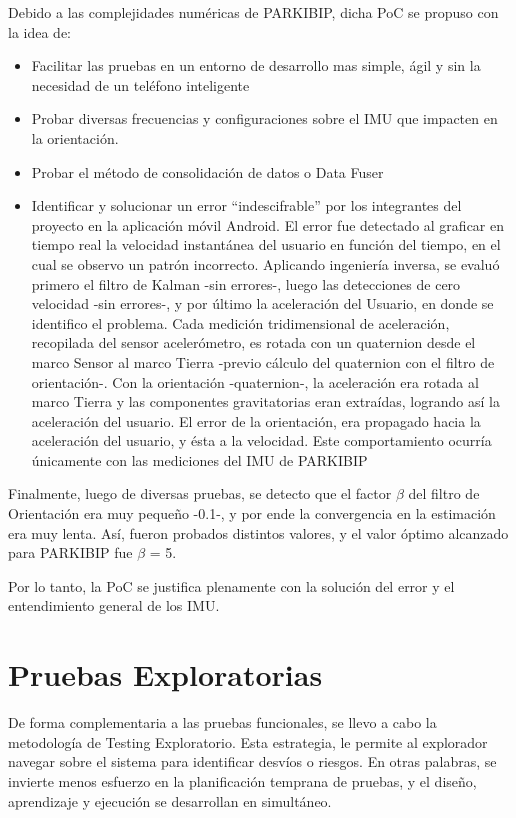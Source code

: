 Debido a las complejidades numéricas de PARKIBIP, dicha PoC se propuso con la idea de:

\begin{itemize}
    \item Facilitar las pruebas en un entorno de desarrollo mas simple,  ágil y sin la necesidad de un teléfono inteligente
    \item Probar diversas frecuencias y configuraciones sobre el IMU que impacten en la orientación.
    \item Probar el método de consolidación de datos o Data Fuser
    \item Identificar y solucionar un error ``indescifrable'' por los integrantes del proyecto en la aplicación móvil Android. El error fue detectado al graficar en tiempo real la velocidad instantánea del usuario en función del tiempo, en el cual se observo un patrón incorrecto. Aplicando ingeniería inversa, se evaluó primero el filtro de Kalman -sin errores-, luego las detecciones de cero velocidad -sin errores-, y por último la aceleración del Usuario, en donde se identifico el problema. Cada medición tridimensional de aceleración, recopilada del sensor acelerómetro, es rotada con un quaternion desde el marco Sensor al marco Tierra -previo cálculo del quaternion con el filtro de orientación-. Con la orientación -quaternion-, la aceleración era rotada al marco Tierra y las componentes gravitatorias eran extraídas, logrando así la aceleración del usuario. El error de la orientación, era propagado hacia la aceleración del usuario, y ésta a la velocidad. Este comportamiento ocurría únicamente con las mediciones del IMU de PARKIBIP
\end{itemize}

Finalmente, luego de diversas pruebas, se detecto que el factor $\beta$ del filtro de Orientación era muy pequeño -0.1-, y por ende la convergencia en la estimación era muy lenta. Así, fueron probados distintos valores, y el valor óptimo alcanzado para PARKIBIP fue $\beta$ = 5.

Por lo tanto, la PoC se justifica plenamente con la solución del error y el entendimiento general de los IMU.


\section{Pruebas Exploratorias}

De forma complementaria a las pruebas funcionales, se llevo a cabo la metodología de Testing Exploratorio. Esta estrategia, le permite al explorador navegar sobre el sistema para identificar desvíos o riesgos. En otras palabras, se invierte menos esfuerzo en la planificación temprana de pruebas, y el diseño, aprendizaje y ejecución se desarrollan en simultáneo.

